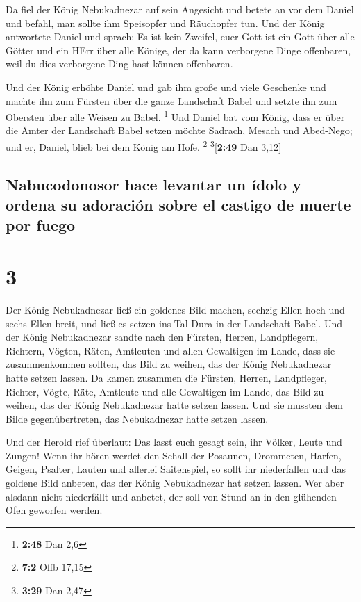  Da fiel der König Nebukadnezar auf sein Angesicht und
betete an vor dem Daniel und befahl, man sollte ihm Speisopfer und
Räuchopfer tun.  Und der König antwortete Daniel und
sprach: Es ist kein Zweifel, euer Gott ist ein Gott über alle Götter und
ein HErr über alle Könige, der da kann verborgene Dinge offenbaren, weil
du dies verborgene Ding hast können offenbaren.

 Und der König erhöhte Daniel und gab ihm große und viele
Geschenke und machte ihn zum Fürsten über die ganze Landschaft Babel und
setzte ihn zum Obersten über alle Weisen zu Babel. \footnote{\textbf{2:48}
  Dan 2,6}  Und Daniel bat vom König, dass er über die
Ämter der Landschaft Babel setzen möchte Sadrach, Mesach und Abed-Nego;
und er, Daniel, blieb bei dem König am Hofe. \footnote{\textbf{7:2} Offb
  17,15} \footnote{\textbf{3:29} Dan 2,47}{[}\textbf{2:49} Dan 3,12{]}

\hypertarget{nabucodonosor-hace-levantar-un-uxeddolo-y-ordena-su-adoraciuxf3n-sobre-el-castigo-de-muerte-por-fuego}{%
\subsection{Nabucodonosor hace levantar un ídolo y ordena su adoración
sobre el castigo de muerte por
fuego}\label{nabucodonosor-hace-levantar-un-uxeddolo-y-ordena-su-adoraciuxf3n-sobre-el-castigo-de-muerte-por-fuego}}

\hypertarget{section-2}{%
\section{3}\label{section-2}}

 Der König Nebukadnezar ließ ein goldenes Bild machen,
sechzig Ellen hoch und sechs Ellen breit, und ließ es setzen ins Tal
Dura in der Landschaft Babel.  Und der König Nebukadnezar
sandte nach den Fürsten, Herren, Landpflegern, Richtern, Vögten, Räten,
Amtleuten und allen Gewaltigen im Lande, dass sie zusammenkommen
sollten, das Bild zu weihen, das der König Nebukadnezar hatte setzen
lassen.  Da kamen zusammen die Fürsten, Herren,
Landpfleger, Richter, Vögte, Räte, Amtleute und alle Gewaltigen im
Lande, das Bild zu weihen, das der König Nebukadnezar hatte setzen
lassen. Und sie mussten dem Bilde gegenübertreten, das Nebukadnezar
hatte setzen lassen.

 Und der Herold rief überlaut: Das lasst euch gesagt sein,
ihr Völker, Leute und Zungen!  Wenn ihr hören werdet den
Schall der Posaunen, Drommeten, Harfen, Geigen, Psalter, Lauten und
allerlei Saitenspiel, so sollt ihr niederfallen und das goldene Bild
anbeten, das der König Nebukadnezar hat setzen lassen. 
Wer aber alsdann nicht niederfällt und anbetet, der soll von Stund an in
den glühenden Ofen geworfen werden.

